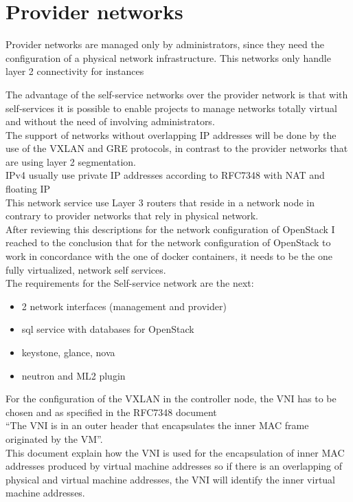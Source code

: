 \section{Provider networks}

Provider networks are managed only by administrators, since they need the configuration of a physical network infrastructure. This networks only handle layer 2 connectivity for instances\\


The advantage of the self-service networks over the provider network is that with self-services it is possible to enable projects to manage networks totally virtual and without the need of  involving administrators.\\

The support of networks without overlapping IP addresses will be done by the use of the VXLAN and GRE protocols, in contrast to the provider networks that are using layer 2 segmentation.\cite{6} \\

IPv4 usually use private IP addresses according to RFC7348 \cite{7}  with NAT and floating IP \\

This network service use Layer 3 routers that reside in a network node in contrary to provider networks that rely in physical network. \\

After reviewing this descriptions for the network configuration of OpenStack I reached to the conclusion that for the network configuration of OpenStack to work in concordance with the one of docker containers, it needs to be the one fully virtualized, network self services.\\

The requirements for the Self-service network are the next:\\

\begin{itemize}
\item 2 network interfaces (management and provider)
\item sql service with  databases for OpenStack
\item keystone, glance, nova 
\item neutron and ML2 plugin
\end{itemize}

For the configuration of the VXLAN in the controller node, the VNI has to be chosen and as specified in the RFC7348 document \\

“The VNI is in an outer header that encapsulates the inner MAC frame originated by the VM”.\cite{7}  \\

This document explain how the VNI is used for the encapsulation of inner MAC addresses produced by virtual machine addresses so if there is an overlapping of physical and virtual machine addresses, the VNI will identify the inner virtual machine addresses.\\